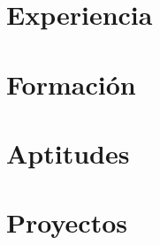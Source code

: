 \documentclass{article}[a4]
\begin{document}


\section*{Experiencia}



\section*{Formación}



\section*{Aptitudes}



\section*{Proyectos}


\end{document}
